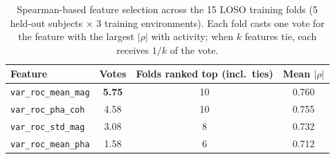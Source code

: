 \begin{table}[htbp]
  \centering
  \caption{Spearman-based feature selection across the 15 LOSO training folds
  (5 held-out subjects $\times$ 3 training environments). Each fold casts one
  vote for the feature with the largest $|\rho|$ with activity; when $k$
  features tie, each receives $1/k$ of the vote.}
  \label{tab:feature_selection_votes}
  \begin{tabular}{lccc}
    \toprule
    Feature & Votes & Folds ranked top (incl.\ ties) & Mean $|\rho|$ \\
    \midrule
    \texttt{var\_roc\_mean\_mag} & \textbf{5.75} & 10 & 0.760 \\
    \texttt{var\_roc\_pha\_coh}  & 4.58 & 10 & 0.755 \\
    \texttt{var\_roc\_std\_mag}  & 3.08 & 8  & 0.732 \\
    \texttt{var\_roc\_mean\_pha} & 1.58 & 6  & 0.712 \\
    \bottomrule
  \end{tabular}
\end{table}
